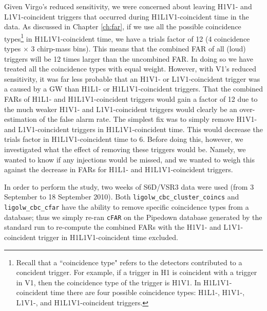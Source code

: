 Given Virgo's reduced sensitivity, we were concerned about leaving H1V1- and
L1V1-coincident triggers that occurred during H1L1V1-coincident time in the
data. As discussed in Chapter \ref{ch:far}, if we use all the possible
coincidence types\footnote{Recall that a ``coincidence type" refers to the
detectors contributed to a concident trigger. For example, if a trigger in H1
is coincident with a trigger in V1, then the coincidence type of the trigger is
H1V1. In H1L1V1-coincident time there are four possible coincidence types:
H1L1-, H1V1-, L1V1-, and H1L1V1-coincident triggers.} in H1L1V1-coincident
time, we have a trials factor of 12 (4 coincidence types $\times$ 3 chirp-mass
bins). This means that the combined \ac{FAR} of all (loud) triggers will be 12
times larger than the uncombined \ac{FAR}. In doing so we have treated all the
coincidence types with equal weight. However, with V1's reduced sensitivity, it
was far less probable that an H1V1- or L1V1-coincident trigger was a caused by
a GW than H1L1- or H1L1V1-coincident triggers. That the combined \acp{FAR} of
H1L1- and H1L1V1-coincident triggers would gain a factor of 12 due to the much
weaker H1V1- and L1V1-coincident triggers would clearly be an over-estimation
of the false alarm rate. The simplest fix was to simply remove H1V1- and
L1V1-coincident triggers in H1L1V1-coincident time. This would decrease the
trials factor in H1L1V1-coincident time to 6. Before doing this, however, we
investigated what the effect of removing these triggers would be. Namely, we
wanted to know if any injections would be missed, and we wanted to weigh this
against the decrease in \acp{FAR} for H1L1- and H1L1V1-coincident triggers.

In order to perform the study, two weeks of S6D/VSR3 data were used (from 3
September to 18 September 2010). Both \verb|ligolw_cbc_cluster_coincs| and
\verb|ligolw_cbc_cfar| have the ability to remove specific coincidence types
from a database; thus we simply re-ran \texttt{cFAR} on the Pipedown database
generated by the standard run to re-compute the combined \acp{FAR} with the
H1V1- and L1V1-coincident trigger in H1L1V1-coincident time excluded. 


